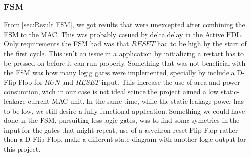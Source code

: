  \subsubsection{FSM}
 From \ref{sec:Result FSM}, we got results that were unexcepted after combining the FSM to the MAC. This was probably casued by delta delay in the Active HDL. Only requirements the FSM had was that $RESET$ had to be high by the start of the first cycle. This isn't an issue in a application by initializing a restart has to be pressed on before it can run properly. Something that was not beneficial with the FSM was how many logig gates were implemented, specially by include a D- Flip Flop for $RUN$ and $RESET$ input. This increase the use of area and power consumtion, wich in our case is not ideal scince the project aimed a low static-leakage current MAC-unit. In the same time, while the static-leakage power has to be low, we still desire a fully functional application. Something we could have done in the FSM, pursuiting less logic gates, was to find some symetries in the input for the gates that might repeat, use of a asychron reset Flip Flop rather then a D Flip Flop, make a different state diagram with another logic output for this project.